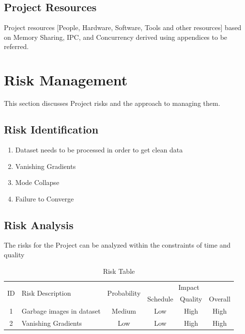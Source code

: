 \documentclass[oneside,a4paper,12pt]{report}
\begin{document}
\subsection{Project Resources}
          Project resources  [People, Hardware, Software, Tools and other resources] based on Memory Sharing, IPC, and Concurrency derived using appendices to be referred.

\section{Risk Management }
This section discusses Project risks and the approach to managing them.
\subsection{Risk Identification}
\begin{enumerate}
  \item Dataset needs to be processed in order to get clean data
  \item Vanishing Gradients
  \item Mode Collapse
  \item Failure to Converge
\end{enumerate}

\subsection{Risk Analysis}
The risks for the Project can be analyzed within the constraints of time and quality

\begin{table}[!htbp]
\begin{center}
\def\arraystretch{1.5}
\begin{tabularx}{\textwidth}{| c | X | c | c | c | c |}
\hline
\multirow{2}{*}{ID} & \multirow{2}{*}{Risk Description}	& \multirow{2}{*}{Probability} & \multicolumn{3}{|c|}{Impact} \\ \cline{4-6}
	& & &	Schedule	& Quality	& Overall \\ \hline
1	& Garbage images in dataset	& Medium	& Low	& High	& High \\ \hline
2	& Vanishing Gradients 	& Low	& Low	& High	& High \\ \hline
\end{tabularx}
\end{center}
\caption{Risk Table}
\label{tab:risk}
\end{table}
\end{document}
